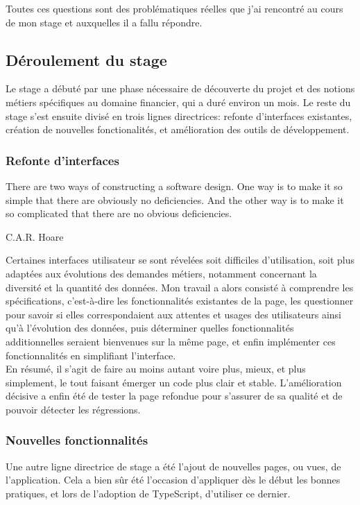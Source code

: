 \documentclass[a4paper,french,12pt]{article}
\begin{document}
		Toutes ces questions sont des problématiques réelles que j'ai rencontré au cours de mon stage et auxquelles il a fallu répondre.


	\subsection{Déroulement du stage}
		Le stage a débuté par une phase nécessaire de découverte du projet et des notions métiers spécifiques au domaine financier, qui a duré environ un mois. Le reste du stage s'est ensuite divisé en trois lignes directrices: refonte d'interfaces existantes, création de nouvelles fonctionalités, et amélioration des outils de développement.
	
		\subsubsection{Refonte d'interfaces}
		\epigraph{There are two ways of constructing a software design.  One way is to make it so simple that there are obviously no deficiencies. And the other way is to make it so complicated that there are no obvious deficiencies.}{C.A.R. Hoare}
		
		Certaines interfaces utilisateur se sont révelées soit difficiles d'utilisation, soit plus adaptées aux évolutions des demandes métiers, notamment concernant la diversité et la quantité des données. Mon travail a alors consisté à comprendre les spécifications, c'est-à-dire les fonctionnalités existantes de la page, les questionner pour savoir si elles correspondaient aux attentes et usages des utilisateurs ainsi qu'à l'évolution des données, puis déterminer quelles fonctionnalités additionnelles seraient bienvenues sur la même page,  et enfin implémenter ces fonctionnalités en simplifiant l'interface. ~\\
		En résumé, il s'agit de faire au moins autant voire plus, mieux, et plus simplement, le tout faisant émerger un code plus clair et stable.
		L'amélioration décisive a enfin été de tester la page refondue pour s'assurer de sa qualité et de pouvoir détecter les régressions.
		
		\subsubsection{Nouvelles fonctionnalités}
		
		Une autre ligne directrice de stage a été l'ajout de nouvelles pages, ou vues, de l'application. Cela a bien sûr été l'occasion d'appliquer dès le début les bonnes pratiques, et lors de l'adoption de TypeScript, d'utiliser ce dernier.
		
\end{document}
